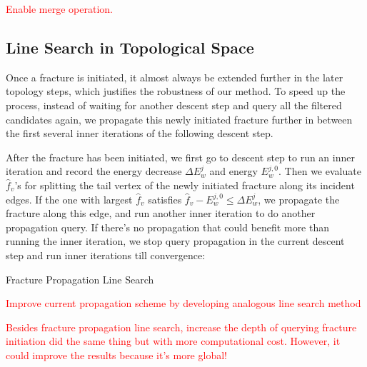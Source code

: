 \textcolor{red}{
Enable merge operation.
}

\subsection{Line Search in Topological Space}

Once a fracture is initiated, it almost always be extended further in the later topology steps, which justifies the robustness of our method. To speed up the process, instead of waiting for another descent step and query all the filtered candidates again, we propagate this newly initiated fracture further in between the first several inner iterations of the following descent step.

After the fracture has been initiated, we first go to descent step to run an inner iteration and record the energy decrease $\Delta E_w^j$ and energy $E_w^{j,0}$. Then we evaluate $\hat{f}_v$'s for splitting the tail vertex of the newly initiated fracture along its incident edges. If the one with largest $\hat{f}_v$ satisfies $\hat{f}_v - E_w^{j,0} \leq \Delta E_w^j$, we propagate the fracture along this edge, and run another inner iteration to do another propagation query. If there's no propagation that could benefit more than running the inner iteration, we stop query propagation in the current descent step and run inner iterations till convergence:

\begin{algorithm}[h]
\SetAlgoLined
{}
\caption{Fracture Propagation Line Search}
\end{algorithm}

\textcolor{red}{Improve current propagation scheme by developing analogous line search method}

\textcolor{red}{Besides fracture propagation line search, increase the depth of querying fracture initiation did the same thing but with more computational cost. However, it could improve the results because it's more global!}

